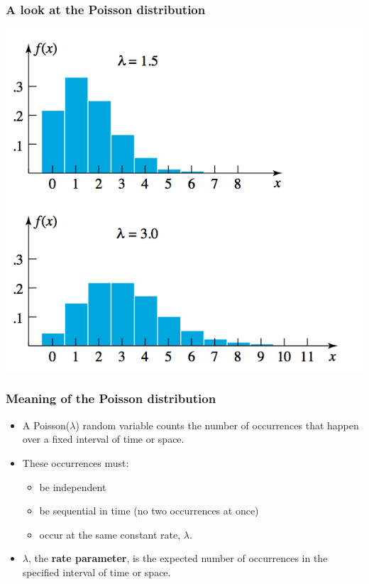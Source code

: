 \documentclass[handout]{beamer}\usepackage[]{graphicx}\usepackage[]{color}
\numberwithin{equation}{section}
\begin{document}
\begin{frame}
\frametitle{A look at the Poisson distribution}
\begin{center}
 \includegraphics{../../fig/poissonbar.png}
\end{center}
\end{frame}

\begin{frame}
\frametitle{Meaning of the Poisson distribution}
\begin{itemize}
\pause \item A Poisson($\lambda$) random variable counts the number of occurrences that happen over a fixed interval of time or space.
\pause \item These occurrences must:
\begin{itemize}
\pause \item be independent
\pause \item be sequential in time (no two occurrences at once)
\pause \item occur at the same constant rate, $\lambda$.
\end{itemize}
\pause \item $\lambda$, the {\bf rate parameter}, is the expected number of occurrences in the specified interval of time or space.
\end{itemize}
\end{frame}
\end{document}
